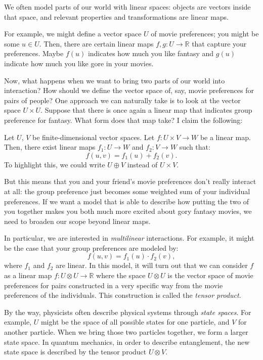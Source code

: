We often model parts of our world with linear spaces: objects are vectors inside that space, and relevant properties and transformations are linear maps. 

For example, we might define a vector space $U$ of movie preferences; you might be some $u \in U$. Then, there are certain linear maps $f,g : U \to \mathbb{R}$ that capture your preferences. Maybe $f(u)$ indicates how much you like fantasy and $g(u)$ indicate how much you like gore in your movies.

Now, what happens when we want to bring two parts of our world into interaction? How should we define the vector space of, say, movie preferences for pairs of people? One approach we can naturally take is to look at the vector space $U \times U$. Suppose that there is once again a linear map that indicates group preference for fantasy. What form does that map take? I claim the following:

\begin{claim}\label{unique-decomposability}
Let $U$, $V$ be finite-dimensional vector spaces. Let $f : U \times V \to W$ be a linear map. Then, there exist linear maps $f_1 : U \to W$ and $f_2: V \to W$ such that:
\[f(u,v) = f_1(u) + f_2(v).\]
To highlight this, we could write $U \oplus V$ instead of $U \times V$.
\end{claim}

But this means that you and your friend's movie preferences don't really interact at all: the group preference just becomes some weighted sum of your individual preferences. If we want a model that is able to describe how putting the two of you together makes you both much more excited about gory fantasy movies, we need to broaden our scope beyond linear maps.

In particular, we are interested in \emph{multilinear} interactions. For example, it might be the case that your group preferences are modeled by:
\[f(u,v) = f_1(u) \cdot f_2(v),\]
where $f_1$ and $f_2$ are linear.  In this model, it will turn out that we can consider $f$ as a linear map $f: U \otimes U \to \mathbb{R}$ where the space $U \otimes U$ is the vector space of movie preferences for pairs constructed in a very specific way from the movie preferences of the individuals. This construction is called the \emph{tensor product}.


By the way, physicists often describe physical systems through \emph{state spaces}. For example, $U$ might be the space of all possible states for one particle, and $V$ for another particle. When we bring those two particles together, we form a larger state space. In quantum mechanics, in order to describe entanglement, the new state space is described by the tensor product $U \otimes V$.

